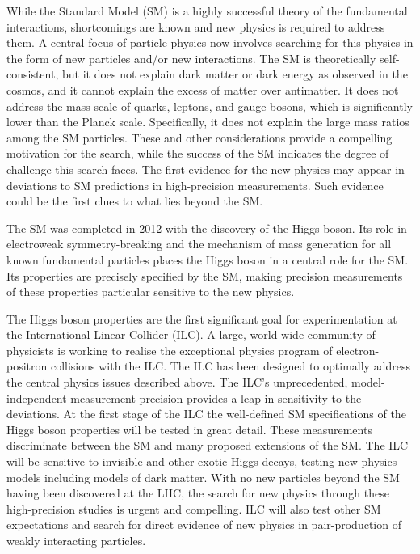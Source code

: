 While the Standard Model (SM) is a highly successful theory of
the fundamental interactions, shortcomings are known and new physics
is required to address them.  A central focus of particle physics
now involves
searching for this physics in the form
of new particles and/or new interactions.  The SM is theoretically
 self-consistent, but it does not explain dark matter or dark energy
 as observed in the cosmos,
and it cannot explain the excess of matter over antimatter.   It does
not address the mass scale of quarks, leptons, and gauge 
bosons, which is significantly lower than the Planck scale.   
Specifically, it does not explain
the large mass ratios among the SM particles.   
These and other considerations provide a compelling motivation
for the search, while the success of the SM indicates
the degree of challenge this search faces.
The first evidence for the new physics
may appear in deviations to SM predictions 
in high-precision measurements. 
Such evidence could be the first clues to what lies beyond the SM.

The SM was completed in 2012 with the discovery of the Higgs boson.
Its role in electroweak symmetry-breaking and the mechanism of
mass generation for all known fundamental particles places the Higgs boson
in a central role for the SM.  Its properties are precisely
specified by the SM, making precision measurements of these
properties particular sensitive to the new physics.
 
The Higgs boson properties are the first significant goal for
experimentation at the International Linear Collider (ILC).
A large, world-wide community of physicists is working to realise
the exceptional physics program
of electron-positron collisions with the ILC.
The ILC has been designed to optimally address the
central physics issues described above.  The ILC's unprecedented, model-independent measurement precision
provides a leap in sensitivity to the deviations.
At the first stage of the ILC the well-defined SM specifications
of the Higgs boson properties will be tested in great detail.
These measurements 
discriminate between the SM and many proposed extensions of the SM.
The ILC will be sensitive to invisible and other exotic Higgs decays,
testing new physics models including models of dark
matter.  With no new particles beyond the SM having been
discovered at the LHC, the search for new physics through
these high-precision studies is urgent and compelling. 
ILC will also test other SM expectations 
and search for direct evidence of new physics
in pair-production of weakly interacting particles.


